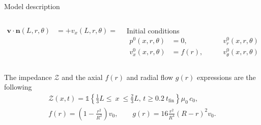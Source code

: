 \documentclass[aspectratio=169]{ISAE-Beamer}
\begin{document}
\begin{frame}{Model description}
\begin{overlayarea}{\textwidth}{\textheight}
{\begin{columns}[T]
\begin{column}{.45\textwidth}
\begin{align*}
				\bm{v} \cdot \bm{n}(L, r, \theta) &= +v_x(L, r, \theta) = + f(r), 
				\end{align*}
			\end{column}
			\begin{column}{.45\textwidth}
				Initial conditions
				\begin{equation*}
				\begin{aligned}
				p^0(x, r, \theta) &= 0, \\
				v_x^0(x, r, \theta) &= f(r), 
				\end{aligned}  \qquad
				\begin{aligned}
				v_r^0(x, r, \theta) &= g(r), \\
				v_\theta^0(x, r, \theta) &= 0.
				\end{aligned}    
				\end{equation*}
			\end{column}
		\end{columns}
		\vspace{5pt}
		The impedance $\mathcal{Z}$ and the axial $f(r)$ and radial flow $g(r)$ expressions are the following
		\begin{equation*}
		\begin{aligned}
		\mathcal{Z}(x, t) = \mathds{1}\left\{ \frac{1}{3} L \leq \ x \ \leq \frac{2}{3} L, \,  t \geq 0.2 \ t_{\text{fin}} \right\} \mu_0 \, c_0, \\
		f(r) = \left( 1 - \frac{r^2}{R^2} \right) v_0, \qquad
		g(r) = 16 \frac{r^2}{R^4} \left( R - r \right)^2 v_0. 
		\end{aligned}
		\end{equation*}
	}
\end{overlayarea}
\end{frame}
\end{document}
